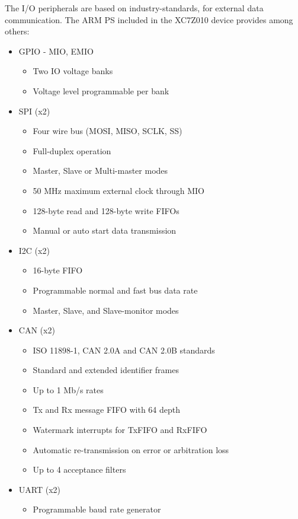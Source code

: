 The I/O peripherals are based on industry-standards, for external data communication. The ARM PS
included in the XC7Z010 device provides among others:

\begin{itemize}
	\item GPIO - MIO, EMIO
	\begin{itemize}
		\item Two IO voltage banks
		\item Voltage level programmable per bank
	\end{itemize}
	\item SPI (x2)
	\begin{itemize}
		\item Four wire bus (MOSI, MISO, SCLK, SS)
		\item Full-duplex operation
		\item Master, Slave or Multi-master modes
		\item 50 MHz maximum external clock through MIO
		\item 128-byte read and 128-byte write FIFOs
		\item Manual or auto start data transmission
	\end{itemize}
	\item I2C (x2)
	\begin{itemize}
		\item 16-byte FIFO
		\item Programmable normal and fast bus data rate
		\item Master, Slave, and Slave-monitor modes
	\end{itemize}
	\item CAN (x2)
	\begin{itemize}
		\item ISO 11898-1, CAN 2.0A and CAN 2.0B standards
		\item Standard and extended identifier frames
		\item Up to 1 Mb/s rates
		\item Tx and Rx message FIFO with 64 depth
		\item Watermark interrupts for TxFIFO and RxFIFO
		\item Automatic re-transmission on error or arbitration loss
		\item Up to 4 acceptance filters
	\end{itemize}
	\item UART (x2)
	\begin{itemize}
		\item Programmable baud rate generator

\end{itemize}
\end{itemize}
